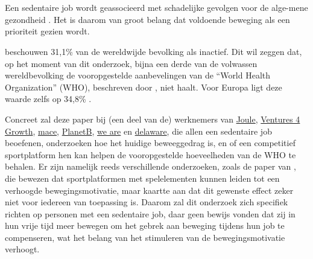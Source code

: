 
\chapter{}%
\label{ch:inleiding}


\section{}%
\label{sec:probleemstelling}

Een sedentaire job wordt geassocieerd met schadelijke gevolgen voor de alge-\linebreak mene gezondheid \autocite{Buckley2015}. Het is daarom van groot belang dat voldoende beweging als een prioriteit gezien wordt.

\textcite{Hallal2012} beschouwen 31,1\% van de wereldwijde bevolking als inactief. Dit wil zeggen dat, op het moment van dit onderzoek, bijna een derde van de volwassen wereldbevolking de vooropgestelde aanbevelingen van de ``World Health Organization'' (WHO), beschreven door \textcite{Bull2020}, niet haalt. Voor Europa ligt deze waarde zelfs op 34,8\% \autocite{Bull2020}.

Concreet zal deze paper bij (een deel van de) werknemers van \href{https://en.joule.be/}{Joule}, \href{https://www.ventures4growth.com/en}{Ventures 4 Growth}, \href{https://www.mace-legal.com/}{mace}, \href{https://planetb.life/en}{PlanetB}, \href{https://www.we-are.be/}{we are} en \href{https://www.delaware.pro/en-be}{delaware}, die allen een sedentaire job beoefenen, onderzoeken hoe het huidige beweeggedrag is, en of een competitief sportplatform hen kan helpen de vooropgestelde hoeveelheden van de WHO te behalen. Er zijn namelijk reeds verschillende onderzoeken, zoals de paper van \textcite{Kari2016}, die bewezen dat sportplatformen met spelelementen kunnen leiden tot een verhoogde bewegingsmotivatie, maar \textcite{Hamari2013a} kaartte aan dat dit gewenste effect zeker niet voor iedereen van toepassing is. Daarom zal dit onderzoek zich specifiek richten op personen met een sedentaire job, daar \textcite{Vandelanotte2015} geen bewijs vonden dat zij in hun vrije tijd meer bewegen om het gebrek aan beweging tijdens hun job te compenseren, wat het belang van het stimuleren van de bewegingsmotivatie verhoogt.

